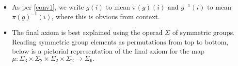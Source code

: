 \begin{rem}
\begin{itemize}
\item As per  \cref{conv1}, we write $g(i)$ to mean $\pi(g)(i)$ and $g^{-1}(i)$ to mean $\pi(g)^{-1}(i)$, where this is obvious from context.  
\item The final axiom is best explained using the operad $\Sigma$ of symmetric groups. Reading symmetric group elements as permutations from top to bottom, below is a pictorial representation of the final axiom for the map $\mu \colon \Sigma_{3} \times \Sigma_{2} \times \Sigma_{2} \times \Sigma_{2} \rightarrow \Sigma_{6}.$

\end{itemize}
\end{rem}
